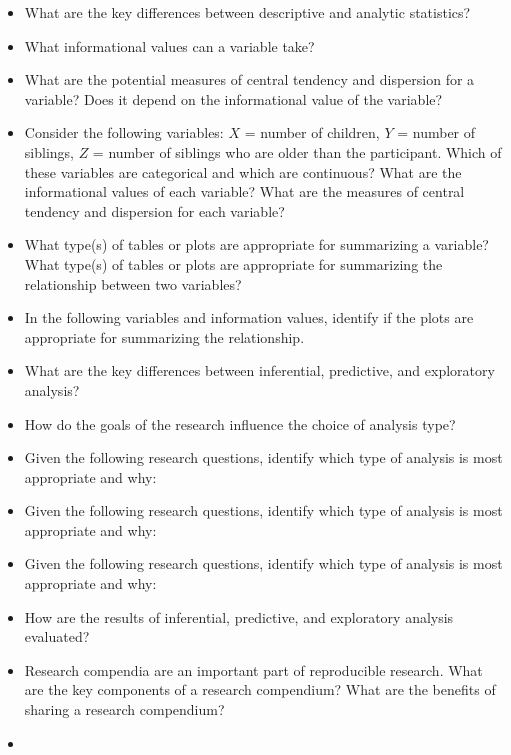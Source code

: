 \documentclass[
  letterpaper,
]{latex/krantz}
\providecommand{\tightlist}{%
  \setlength{\itemsep}{0pt}\setlength{\parskip}{0pt}}\usepackage{longtable,booktabs,array}
\begin{document}

\begin{tcolorbox}[enhanced jigsaw, colbacktitle=quarto-callout-note-color!10!white, arc=.35mm, toprule=.15mm, breakable, colframe=quarto-callout-note-color-frame, bottomrule=.15mm, opacitybacktitle=0.6, coltitle=black, titlerule=0mm, colback=white, toptitle=1mm, bottomtitle=1mm, title=\textcolor{quarto-callout-note-color}{\faInfo}\hspace{0.5em}{Conceptual questions}, rightrule=.15mm, leftrule=.75mm, opacityback=0, left=2mm]

\begin{itemize}
\tightlist
\item
  What are the key differences between descriptive and analytic
  statistics?
\item
  What informational values can a variable take?
\item
  What are the potential measures of central tendency and dispersion for
  a variable? Does it depend on the informational value of the variable?
\item
  Consider the following variables: \(X\) = number of children, \(Y\) =
  number of siblings, \(Z\) = number of siblings who are older than the
  participant. Which of these variables are categorical and which are
  continuous? What are the informational values of each variable? What
  are the measures of central tendency and dispersion for each variable?
\item
  What type(s) of tables or plots are appropriate for summarizing a
  variable? What type(s) of tables or plots are appropriate for
  summarizing the relationship between two variables?
\item
  In the following variables and information values, identify if the
  plots are appropriate for summarizing the relationship.
\item
  What are the key differences between inferential, predictive, and
  exploratory analysis?
\item
  How do the goals of the research influence the choice of analysis
  type?
\item
  Given the following research questions, identify which type of
  analysis is most appropriate and why:
\item
  Given the following research questions, identify which type of
  analysis is most appropriate and why:
\item
  Given the following research questions, identify which type of
  analysis is most appropriate and why:
\item
  How are the results of inferential, predictive, and exploratory
  analysis evaluated?
\item
  Research compendia are an important part of reproducible research.
  What are the key components of a research compendium? What are the
  benefits of sharing a research compendium?
\item
\end{itemize}

\end{tcolorbox}
\end{document}

